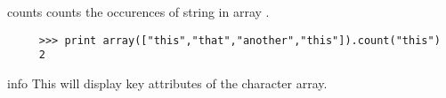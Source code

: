 \begin{methoddesc}[RawCharArray]{count}{s}
   counts the occurences of string  in array .
\begin{verbatim}
     >>> print array(["this","that","another","this"]).count("this")
     2
\end{verbatim}
\end{methoddesc}
\begin{methoddesc}[RawCharArray]{info}{}
   This will display key attributes of the character array.
\end{methoddesc}

